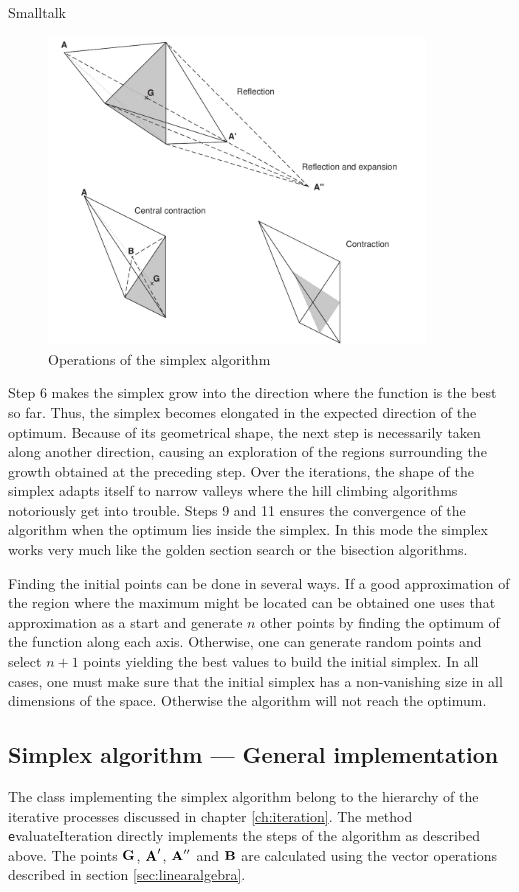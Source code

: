 \begin{displaycode}{Smalltalk}
\begin{figure}
\centering\includegraphics[width=10cm]{Figures/Simplex}
\caption{Operations of the simplex
algorithm}\label{fig:simplexsample}
\end{figure}
Step 6 makes the simplex grow into the direction where the
function is the best so far. Thus, the simplex becomes elongated
in the expected direction of the optimum. Because of its
geometrical shape, the next step is necessarily taken along
another direction, causing an exploration of the regions
surrounding the growth obtained at the preceding step. Over the
iterations, the shape of the simplex adapts itself to narrow
valleys where the hill climbing algorithms notoriously get into
trouble. Steps 9 and 11 ensures the convergence of the algorithm
when the optimum lies inside the simplex. In this mode the simplex
works very much like the golden section search or the bisection
algorithms.

Finding the initial points can be done in several ways. If a good
approximation of the region where the maximum might be located can
be obtained one uses that approximation as a start and generate
$n$ other points by finding the optimum of the function along each
axis. Otherwise, one can generate random points and select $n+1$
points yielding the best values to build the initial simplex. In
all cases, one must make sure that the initial simplex has a
non-vanishing size in all dimensions of the space. Otherwise the
algorithm will not reach the optimum.

\subsection{Simplex algorithm --- General implementation}
The class implementing the simplex algorithm belong to the
hierarchy of the iterative processes discussed in chapter
\ref{ch:iteration}. The method {\texttt evaluateIteration} directly
implements the steps of the algorithm as described above. The
points ${\textbf G}$, ${\textbf A}^{\prime}$, ${\textbf A}^{\prime\prime}$ and
${\textbf B}$ are calculated using the vector operations described in
section \ref{sec:linearalgebra}.


\end{displaycode}
